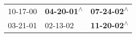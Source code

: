 \begin{supertabular}{lll}
 10-17-00\textsuperscript{} &  \textbf{04-20-01\textsuperscript{$\wedge$}} &  \textbf{07-24-02\textsuperscript{$\wedge$}} \\
 03-21-01\textsuperscript{} &                   02-13-02\textsuperscript{} &  \textbf{11-20-02\textsuperscript{$\wedge$}} \\
\end{supertabular}
